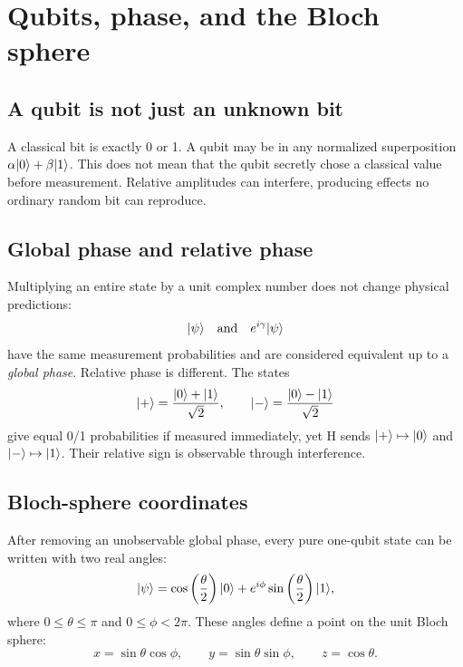\section{Qubits, phase, and the Bloch sphere}

\subsection{A qubit is not just an unknown bit}

A classical bit is exactly 0 or 1. A qubit may be in any normalized
superposition $\alpha\lvert 0\rangle+\beta\lvert 1\rangle$. This does not mean that the qubit
secretly chose a classical value before measurement. Relative amplitudes can
interfere, producing effects no ordinary random bit can reproduce.

\subsection{Global phase and relative phase}

Multiplying an entire state by a unit complex number does not change physical
predictions:
\[
\lvert \psi\rangle\quad\text{and}\quad e^{i\gamma}\lvert \psi\rangle
\]
have the same measurement probabilities and are considered equivalent up to a
\emph{global phase}. Relative phase is different. The states
\[
\lvert +\rangle=\frac{\lvert 0\rangle+\lvert 1\rangle}{\sqrt2},\qquad
\lvert -\rangle=\frac{\lvert 0\rangle-\lvert 1\rangle}{\sqrt2}
\]
give equal 0/1 probabilities if measured immediately, yet H sends
$\lvert +\rangle\mapsto\lvert 0\rangle$ and $\lvert -\rangle\mapsto\lvert 1\rangle$. Their relative sign is observable
through interference.

\subsection{Bloch-sphere coordinates}

After removing an unobservable global phase, every pure one-qubit state can be
written with two real angles:
\[
\lvert \psi\rangle=
\cos\left(\frac{\theta}{2}\right)\lvert 0\rangle+
e^{i\phi}\sin\left(\frac{\theta}{2}\right)\lvert 1\rangle,
\]
where $0\leq\theta\leq\pi$ and $0\leq\phi<2\pi$. These angles define a point on
the unit Bloch sphere:
\[
x=\sin\theta\cos\phi,\qquad
y=\sin\theta\sin\phi,\qquad
z=\cos\theta.
\]

\begin{center}
\end{center}

